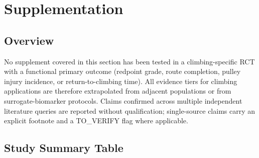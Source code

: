 \section{Supplementation}
\label{sec:supplements}

\subsection*{Overview}

No supplement covered in this section has been tested in a climbing-specific RCT with a functional primary outcome (redpoint grade, route completion, pulley injury incidence, or return-to-climbing time). All evidence tiers for climbing applications are therefore extrapolated from adjacent populations or from surrogate-biomarker protocols. Claims confirmed across multiple independent literature queries are reported without qualification; single-source claims carry an explicit footnote and a TO\_VERIFY flag where applicable.

\subsection{Study Summary Table}
\label{subsec:supptable}

